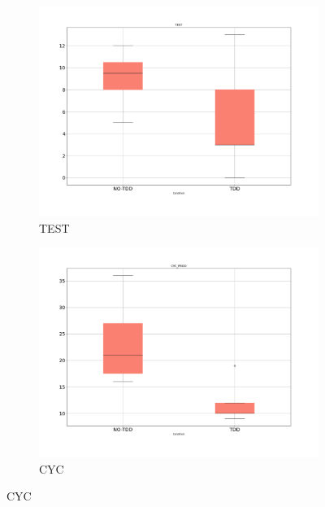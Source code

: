 \begin{figure}[H]
    \begin{subfigure}{0.5\textwidth}
        \includegraphics[width=\linewidth]{figures/box_plots/task2/TEST.png}
        \caption{TEST}
        \label{bp_task2_test}
    \end{subfigure}\hfil
    \begin{subfigure}{0.5\textwidth}
        \includegraphics[width=\linewidth]{figures/box_plots/task2/CYC.png}
        \caption{CYC}
        \label{bp_task2_cyc}
    \end{subfigure}

    \medskip


\end{figure}
